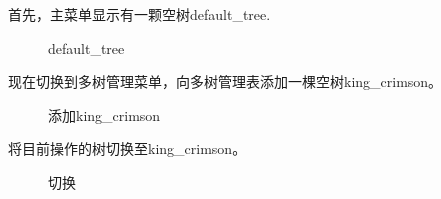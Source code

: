 \documentclass[supercite]{Experimental_Report}
\theoremstyle{definition}
\begin{document}
\noindent
首先，主菜单显示有一颗空树default\_tree.
\begin{figure}[htbp]
	\centering
	\centering
	\caption{default\_tree}
	\label{fig5-85}
\end{figure}

\clearpage
\noindent
现在切换到多树管理菜单，向多树管理表添加一棵空树king\_crimson。
\begin{figure}[htbp]
	\centering
	\centering
	\caption{添加king\_crimson}
	\label{fig5-86}
\end{figure}

\noindent
将目前操作的树切换至king\_crimson。
\begin{figure}[htbp]
	\centering
	\centering
	\caption{切换}
	\label{fig5-87}
\end{figure}
\end{document}
